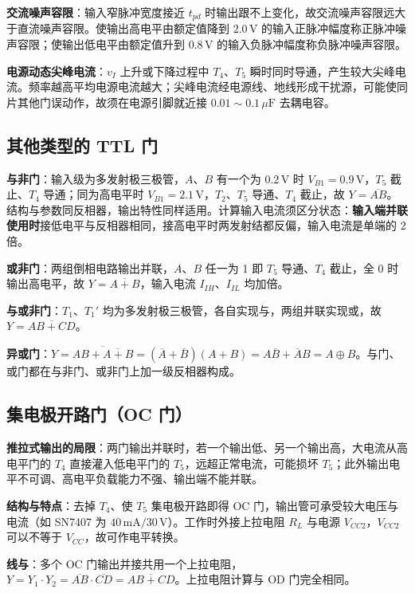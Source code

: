 \textbf{交流噪声容限}：输入窄脉冲宽度接近 \(t_{pd}\) 时输出跟不上变化，故交流噪声容限远大于直流噪声容限。使输出高电平由额定值降到 \(2.0\,\mathrm{V}\) 的输入正脉冲幅度称正脉冲噪声容限；使输出低电平由额定值升到 \(0.8\,\mathrm{V}\) 的输入负脉冲幅度称负脉冲噪声容限。

\textbf{电源动态尖峰电流}：\(v_I\) 上升或下降过程中 \(T_4\)、\(T_5\) 瞬时同时导通，产生较大尖峰电流。频率越高平均电源电流越大；尖峰电流经电源线、地线形成干扰源，可能使同片其他门误动作，故须在电源引脚就近接 \(0.01\sim0.1\,\mu\mathrm{F}\) 去耦电容。

\subsection{其他类型的 TTL 门}
\textbf{与非门}：输入级为多发射极三极管，\(A\)、\(B\) 有一个为 \(0.2\,\mathrm{V}\) 时 \(V_{B1}=0.9\,\mathrm{V}\)，\(T_5\) 截止、\(T_4\) 导通；同为高电平时 \(V_{B1}=2.1\,\mathrm{V}\)，\(T_2\)、\(T_5\) 导通、\(T_4\) 截止，故 \(Y=\overline{AB}\)。结构与参数同反相器，输出特性同样适用。计算输入电流须区分状态：\textbf{输入端并联使用时}接低电平与反相器相同，接高电平时两发射结都反偏，输入电流是单端的 2 倍。

\textbf{或非门}：两组倒相电路输出并联，\(A\)、\(B\) 任一为 1 即 \(T_5\) 导通、\(T_4\) 截止，全 0 时输出高电平，故 \(Y=\overline{A+B}\)，输入电流 \(I_{IH}\)、\(I_{IL}\) 均加倍。

\textbf{与或非门}：\(T_1\)、\(T_1'\) 均为多发射极三极管，各自实现与，两组并联实现或，故 \(Y=\overline{AB+CD}\)。

\textbf{异或门}：\(Y=\overline{AB+\overline{A+B}}=\left(\overline{A}+\overline{B}\right)\left(A+B\right)=A\overline{B}+\overline{A}B=A\oplus B\)。与门、或门都在与非门、或非门上加一级反相器构成。

\subsection{集电极开路门（OC 门）}
\textbf{推拉式输出的局限}：两门输出并联时，若一个输出低、另一个输出高，大电流从高电平门的 \(T_4\) 直接灌入低电平门的 \(T_5\)，远超正常电流，可能损坏 \(T_5\)；此外输出电平不可调、高电平负载能力不强、输出端不能并联。

\textbf{结构与特点}：去掉 \(T_4\)、使 \(T_5\) 集电极开路即得 OC 门，输出管可承受较大电压与电流（如 SN7407 为 \(40\,\mathrm{mA}/30\,\mathrm{V}\)）。工作时外接上拉电阻 \(R_L\) 与电源 \(V_{CC2}\)，\(V_{CC2}\) 可以不等于 \(V_{CC}\)，故可作电平转换。

\textbf{线与}：多个 OC 门输出并接共用一个上拉电阻，
\(Y=Y_1\cdot Y_2=\overline{AB}\cdot\overline{CD}=\overline{AB+CD}\)。上拉电阻计算与 OD 门完全相同。

